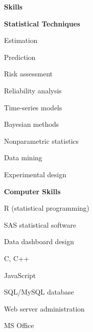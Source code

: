 \documentclass[letterpaper,12pt,final]{memoir}
\newcommand{\MedSep}{\vspace{1em}}
\newcommand{\SmallSep}{\vspace{0.5em}}
\newcommand{\CVSection}[1]
	{\Large\textbf{#1}\par
	\SmallSep\normalsize\normalfont}
\newcommand{\CVItem}[1]
	{\textbf{\color{RoyalBlue} #1}}
\begin{document}
\CVSection{Skills}
\CVItem{Statistical Techniques}
\begin{multicols}{3}
\begin{compactitem}[\color{RoyalBlue}$\bullet$]
	\item Estimation 
  \item Prediction
	\item Risk assessment
  \item Reliability analysis
	\item Time-series models
	\item Bayesian methods
  \item Nonparametric statistics
	\item Data mining
	\item Experimental design
\end{compactitem}
\end{multicols}
\SmallSep
\CVItem{Computer Skills}
\begin{multicols}{3}
\begin{compactitem}[\color{RoyalBlue}$\bullet$]
	\item R (statistical programming)
  \item SAS statistical software
	\item Data dashboard design
	\item C, C++
	\item JavaScript
	\item SQL/MySQL database
  \item Web server administration
  \item MS Office
\end{compactitem}
\end{multicols}
\MedSep 
\end{document}
